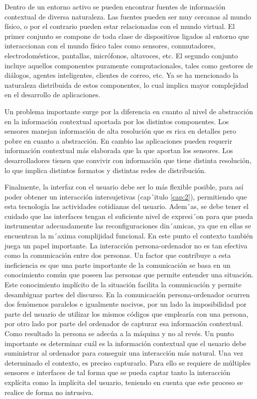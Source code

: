 Dentro de un entorno activo se pueden encontrar fuentes de información
contextual de diversa naturaleza. Las fuentes pueden ser muy cercanas al mundo
físico, o por el contrario pueden estar relacionadas con el mundo virtual. El
primer conjunto se compone de toda clase de dispositivos ligados al entorno que
interaccionan con el mundo físico tales como sensores, conmutadores,
electrodomésticos, pantallas, micrófonos, altavoces, etc. El segundo conjunto
incluye aquellos componentes puramente computacionales, tales como gestores de
diálogos, agentes inteligentes, clientes de correo, etc. Ya se ha mencionado la
naturaleza distribuida de estos componentes, lo cual implica mayor complejidad
en el desarrollo de aplicaciones.


Un problema importante surge por la diferencia en cuanto al nivel de abstracción
en la información contextual aportada por los distintos componentes. Los
sensores manejan información de alta resolución que es rica en detalles pero
pobre en cuanto a abstracción. En cambio las aplicaciones pueden requerir
información contextual más elaborada que la que aportan los sensores. Los
desarrolladores tienen que convivir con información que tiene distinta
resolución, lo que implica distintos formatos y distintas redes de
distribución.


Finalmente, la interfaz con el usuario debe ser lo más flexible posible, para
así poder obtener un interacción intersujetivas (cap´itulo \ref{cap:2}),
permitiendo que esta tecnología las actividades cotidianas del usuario.
Adem´as, se debe tener el cuidado que las interfaces tengan el suficiente nivel
de expresi´on para que pueda instrumentar adecuadamente las reconfiguraciones
din´amicas, ya que en ellas se encuentran la m´axima complijidad
funcional. En este punto el contexto también juega un papel importante. La
interacción persona-ordenador no es tan efectiva como la comunicación entre dos
personas. Un factor que contribuye a esta ineficiencia es que una parte
importante de la comunicación se basa en un conocimiento común que poseen las
personas que permite entender una situación. Este conocimiento implícito de la
situación facilita la comunicación y permite desambiguar partes del discurso. En
la comunicación persona-ordenador ocurren dos fenómenos paralelos e igualmente
nocivos, por un lado la imposibilidad por parte del usuario de utilizar los
mismos códigos que emplearía con una persona, por otro lado por parte del
ordenador de capturar esa información contextual. Como resultado la persona se
adecúa a la máquina y no al revés. Un punto importante es determinar cuál es la
información contextual que el usuario debe suministrar al ordenador para
conseguir una interacción más natural. Una vez determinado el contexto, es
preciso capturarlo. Para ello se requiere de múltiples sensores e interfaces de
tal forma que se pueda captar tanto la interacción explícita como la implícita
del usuario, teniendo en cuenta que este proceso se realice de
forma no intrusiva.  


